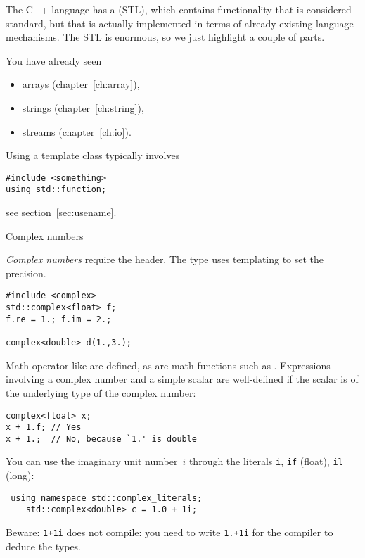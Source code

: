 
The C++ language has a  (STL),
which contains functionality that is considered standard, but that is
actually implemented in terms of already existing language
mechanisms. The STL is enormous, so we just highlight a couple of
parts.

You have already seen
\begin{itemize}
\item
  arrays (chapter~\ref{ch:array}),
\item strings (chapter~\ref{ch:string}),
\item streams (chapter~\ref{ch:io}).
\end{itemize}

Using a template class typically involves
\begin{lstlisting}
#include <something>
using std::function;
\end{lstlisting}
see section~\ref{sec:usename}.

 {Complex numbers}
\label{sec:stl-complex}

\emph{Complex numbers}
require the  header.
The  type uses templating to set the precision.
\begin{lstlisting}
#include <complex>
std::complex<float> f;
f.re = 1.; f.im = 2.;

complex<double> d(1.,3.);
\end{lstlisting}
Math operator like \n{+,*} are defined, as are math functions
such as .
Expressions involving a complex number and a simple scalar
are well-defined if the scalar is of the underlying type
of the complex number:
\begin{lstlisting}
complex<float> x;
x + 1.f; // Yes
x + 1.;  // No, because `1.' is double
\end{lstlisting}

You can use the imaginary unit number~$i$ through the literals
\lstinline{i}, \lstinline{if} (float), \lstinline{il} (long):
\begin{lstlisting}
 using namespace std::complex_literals;
    std::complex<double> c = 1.0 + 1i;
\end{lstlisting}
Beware: \lstinline{1+1i} does not compile:
you need to write \lstinline{1.+1i} for the compiler to deduce the types.

